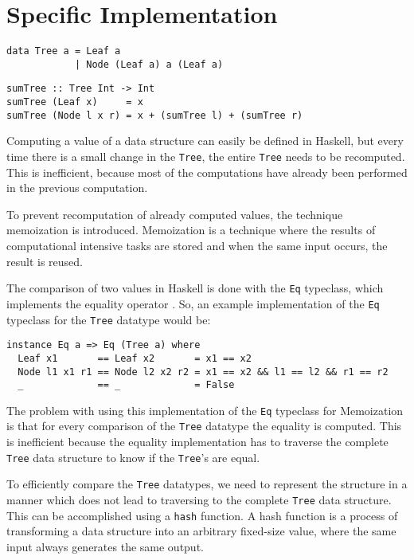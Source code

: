 \chapter{Specific Implementation}
\label{chap-spec-impl}

\begin{verbatim}
data Tree a = Leaf a
            | Node (Leaf a) a (Leaf a)
\end{verbatim}

\begin{verbatim}
sumTree :: Tree Int -> Int
sumTree (Leaf x)     = x
sumTree (Node l x r) = x + (sumTree l) + (sumTree r)
\end{verbatim}

Computing a value of a data structure can easily be defined in Haskell, but every time there is a small change in the \texttt{Tree}, the entire \texttt{Tree} needs to be recomputed. This is inefficient, because most of the computations have already been performed in the previous computation. 

To prevent recomputation of already computed values, the technique memoization is introduced. Memoization is a technique where the results of computational intensive tasks are stored and when the same input occurs, the result is reused. 

The comparison of two values in Haskell is done with the \texttt{Eq} typeclass, which implements the equality operator . So, an example implementation of the \texttt{Eq} typeclass for the \texttt{Tree} datatype would be:

\begin{verbatim}
instance Eq a => Eq (Tree a) where
  Leaf x1       == Leaf x2       = x1 == x2
  Node l1 x1 r1 == Node l2 x2 r2 = x1 == x2 && l1 == l2 && r1 == r2
  _             == _             = False
\end{verbatim}

The problem with using this implementation of the \texttt{Eq} typeclass for Memoization is that for every comparison of the \texttt{Tree} datatype the equality is computed. This is inefficient because the equality implementation has to traverse the complete \texttt{Tree} data structure to know if the \texttt{Tree}'s are equal. 

To efficiently compare the \texttt{Tree} datatypes, we need to represent the structure in a manner which does not lead to traversing to the complete \texttt{Tree} data structure. This can be accomplished using a \texttt{hash} function. A hash function is a process of transforming a data structure into an arbitrary fixed-size value, where the same input always generates the same output. 

